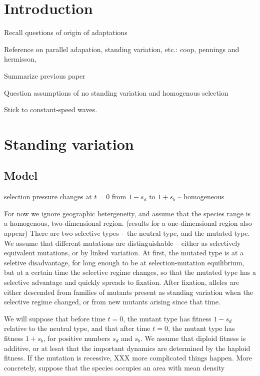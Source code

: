 \documentclass{article}
\begin{document}
\section{Introduction}

Recall questions of origin of adaptations

Reference on parallel adapation, standing variation, etc.:
 coop,
 pennings and hermisson,

Summarize previous paper

Question assumptions of no standing variation and homogenous selection

Stick to constant-speed waves.

\section{Standing variation}

\subsection{Model}

selection pressure changes at $t=0$ from $1-s_d$ to $1+s_b$ -- homogeneous

For now we ignore geographic hetergeneity, and assume that the species range
is a homogenous, two-dimensional region.  (results for a one-dimensional region also appear)
There are two selective types -- the neutral type, and the mutated type.
We assume that different mutations are distinguishable --
either as selectively equivalent mutations, or by linked variation.
At first, the mutated type is at a seletive disadvantage, for long enough to be at selection-mutation equilibrium,
but at a certain time the selective regime changes, so that the mutated type has a selective advantage and quickly spreads to fixation.
After fixation, alleles are either descended
from families of mutants present as standing variation when the selective regime changed,
or from new mutants arising since that time.

We will suppose that before time $t=0$,
the mutant type has fitness $1-s_d$ relative to the neutral type,
and that after time $t=0$,
the mutant type has fitness $1+s_b$,
for positive numbers $s_d$ and $s_b$.
We assume that diploid fitness is additive, or at lesat that the important dynamics are determined by the haploid fitness.
If the mutation is recessive, XXX more complicated things happen.
More concretely, suppose that the species occupies an area with mean density
\end{document}
